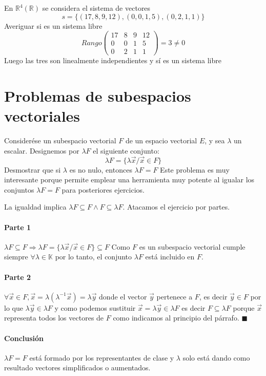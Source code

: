 \begin{problema}{\cite[3p334]{palacios}}{
	En $\mathbb{R}^4(\mathbb{R})$ se considera el sistema de vectores
	$$s=\{(17,8,9,12),(0,0,1,5),(0,2,1,1)\}$$
	Averiguar si es un sistema libre
	}
	$$Rango\begin{pmatrix}
		17 & 8 & 9 & 12 \\
		0 & 0 & 1 & 5 \\
		0 & 2&1&1
	\end{pmatrix}=3 \ne 0$$
	Luego las tres son linealmente independientes y sí es un sistema libre
\end{problema}

\section{Problemas de subespacios vectoriales}
\begin{problema}{\cite[87p139]{prieto2000}}{\label{20200413a}
	Considerése un subespacio vectorial $F$ de un espacio vectorial $E$, y sea $\lambda$ un escalar.
	Designemos por $\lambda F$ el siguiente conjunto:
	$$\lambda F=\{\lambda\vec{x}/\vec{x}\in F\}$$
	Desmostrar que si $\lambda$ es no nulo, entonces $\lambda F=F$
	}
	Este problema es muy interesante porque permite emplear una herramienta muy potente al igualar
	los conjuntos $\lambda F = F$ para posteriores ejercicios.
	
	La igualdad implica $\lambda F\subseteq F \land F\subseteq \lambda F$. Atacamos el ejercicio por
	partes.
	\paragraph{Parte 1} $\lambda F\subseteq F \Rightarrow \lambda F = \{\lambda \vec{x}/\vec{x}\in
	F\} \subseteq F$ Como $F$ es un subespacio vectorial cumple siempre $\forall \lambda \in
	\mathbb{K}$ por lo tanto, el conjunto $\lambda F$ está incluido en $F$.

	\paragraph{Parte 2} $\forall \vec{x}\in F, \vec{x}=\lambda(\lambda^{-1}\vec{x})=\lambda\vec{y}$
	donde el vector $\vec{y}$ pertenece a $F$, es decir $\vec{y}\in F$  por lo que $\lambda\vec{y}\in \lambda
	F$ y como podemos sustituir $\vec{x}=\lambda\vec{y}\in \lambda F$ es decir $F \subseteq \lambda
	F$ porque $\vec{x}$ representa todos los vectores de $F$ como indicamos al principio del
	párrafo. $\blacksquare$

	\paragraph{Conclusión} $\lambda F = F$ está formado por los representantes de clase y $\lambda$
	solo está dando como resultado vectores simplificados o aumentados.
\end{problema}

